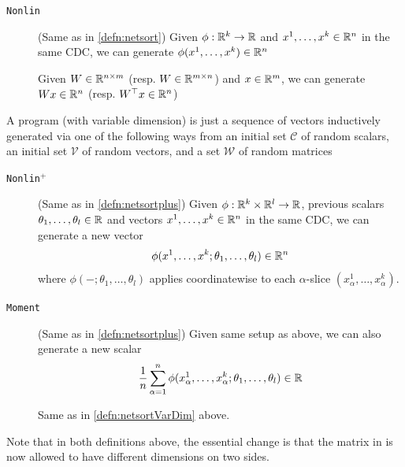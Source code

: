 \documentclass[main.tex]{subfiles}
\begin{document}
\begin{description}
\item [\texttt{Nonlin}\label{instr:nonlinVarDim}] (Same as in \cref{defn:netsort}) Given $\phi:\mathbb{R}^{k}\to\mathbb{R}$ and $x^{1},\ldots,x^{k}\in\mathbb{R}^{n}$ in the same CDC, we can generate $\phi(x^{1},\ldots,x^{k})\in\mathbb{R}^{n}$ 
\item [\label{instr:matmulVarDim}] Given $W\in\mathbb{R}^{n\times m}$ (resp. $W\in\mathbb{R}^{m\times n}$) and $x\in\mathbb{R}^{m}$, we can generate $Wx\in\mathbb{R}^{n}$ (resp. $W^{\top}x\in\mathbb{R}^{n}$)
\end{description}
\begin{defn}
A \netsortplus{} program (with variable dimension) is just a sequence of vectors inductively generated via one of the following ways from an initial set $\mathcal{C}$ of random scalars, an initial set $\mathcal{V}$ of random vectors, and a set $\mathcal{W}$ of random matrices 
\begin{description}
\item [\texttt{Nonlin$^+$}\label{instr:nonlin+VarDim}] (Same as in \cref{defn:netsortplus}) Given $\phi:\mathbb{R}^{k}\times\mathbb{R}^{l}\to\mathbb{R}$, previous scalars $\theta_{1},\ldots,\theta_{l}\in\mathbb{R}$ and vectors $x^{1},\ldots,x^{k}\in\mathbb{R}^{n}$ in the same CDC, we can generate a new vector 
\[
\phi(x^{1},\ldots,x^{k};\theta_{1},\ldots,\theta_{l})\in\mathbb{R}^{n}
\]
where $\phi(-;\theta_{1},\ldots,\theta_{l})$ applies coordinatewise to each $\alpha$-slice $(x_{\alpha}^{1},\ldots,x_{\alpha}^{k})$. 
\item [\texttt{Moment}\label{instr:momentVarDim}] (Same as in \cref{defn:netsortplus}) Given same setup as above, we can also generate a new scalar 
\[
\frac{1}{n}\sum_{\alpha=1}^{n}\phi(x_{\alpha}^{1},\ldots,x_{\alpha}^{k};\theta_{1},\ldots,\theta_{l})\in\mathbb{R}
\]
\item [\label{instr:matmul+VarDim}] Same as in \cref{defn:netsortVarDim} above.
\end{description}
\end{defn}
Note that in both definitions above, the essential change is that the matrix in  is now allowed to have different dimensions on two sides.
\end{document}
